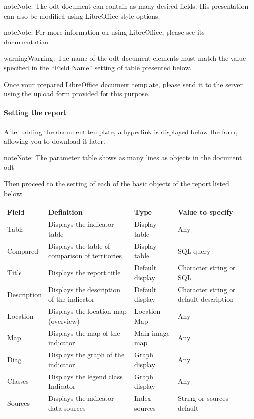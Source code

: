 \documentclass[letterpaper,10pt,english]{sphinxmanual}
\begin{document}
\begin{notice}{note}{Note:}
The odt document can contain as many desired fields. His presentation can also be modified using LibreOffice style options.
\end{notice}

\begin{notice}{note}{Note:}
For more information on using LibreOffice, please see its \href{http://www.libreoffice.org/get-help/documentation/}{documentation}
\end{notice}

\begin{notice}{warning}{Warning:}
The name of the odt document elements must match the value specified in the ``Field Name'' setting of table presented below.
\end{notice}

Once your prepared LibreOffice document template, please send it to the server using the upload form provided for this purpose.
\paragraph{Setting the report}

After adding the document template, a hyperlink is displayed below the form, allowing you to download it later.

\begin{notice}{note}{Note:}
The parameter table shows as many lines as objects in the document odt
\end{notice}

Then proceed to the setting of each of the basic objects of the report listed below:

\begin{tabulary}{\linewidth}{|L|L|L|L|}
\hline

\textbf{Field}
 & 
\textbf{Definition}
 & 
\textbf{Type}
 & 
\textbf{Value to specify}
\\
\hline
Table
 & 
Displays the indicator table
 & 
Display table
 & 
Any
\\
\hline
Compared
 & 
Displays the table of comparison of territories
 & 
Display table
 & 
SQL query
\\
\hline
Title
 & 
Displays the report title
 & 
Default display
 & 
Character string or SQL
\\
\hline
Description
 & 
Displays the description of the indicator
 & 
Default display
 & 
Character string or default description
\\
\hline
Location
 & 
Displays the location map (overview)
 & 
Location Map
 & 
Any
\\
\hline
Map
 & 
Displays the map of the indicator
 & 
Main image map
 & 
Any
\\
\hline
Diag
 & 
Displays the graph of the indicator
 & 
Graph display
 & 
Any
\\
\hline
Classes
 & 
Displays the legend class Indicator
 & 
Graph display
 & 
Any
\\
\hline
Sources
 & 
Displays the indicator data sources
 & 
Index sources
 & 
String or sources default
\\
\hline\end{tabulary}
\end{document}
